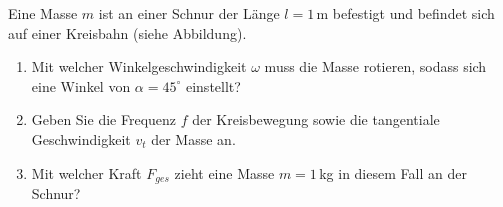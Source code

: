 \begin{ExerciseBlock}
Eine Masse $m$ ist an einer Schnur der Länge $l=1\,$m befestigt und befindet sich auf einer Kreisbahn (siehe Abbildung).

\begin{center}
\end{center}

\begin{enumerate}
	\item Mit welcher Winkelgeschwindigkeit $\omega$ muss die Masse rotieren, sodass sich eine Winkel von $\alpha = 45^\circ$ einstellt?

	\item Geben Sie die Frequenz $f$ der Kreisbewegung sowie die tangentiale Geschwindigkeit $v_t$ der Masse an.

	\item Mit welcher Kraft $F_{ges}$ zieht eine Masse $m=1\,$kg in diesem Fall an der Schnur?

\end{enumerate}
\end{ExerciseBlock}
